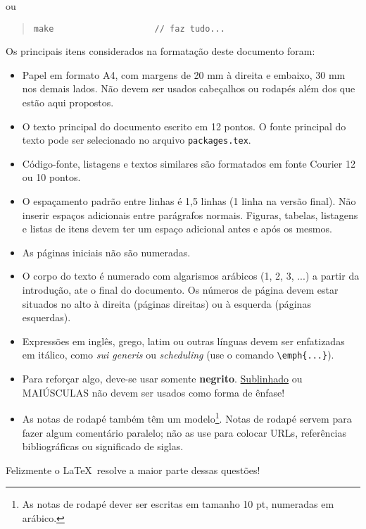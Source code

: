 ou

\begin{quote}
\begin{footnotesize}
\begin{verbatim}
make                    // faz tudo...
\end{verbatim}
\end{footnotesize}
\end{quote}

Os principais itens considerados na formatação deste documento foram:

\begin{itemize}

\item Papel em formato A4, com margens de 20 mm à direita e embaixo, 30 mm nos demais lados. Não devem ser usados cabeçalhos ou rodapés além dos que estão aqui propostos.

\item O texto principal do documento escrito em 12 pontos. O fonte principal do texto pode ser selecionado no arquivo \verb#packages.tex#.

\item Código-fonte, listagens e textos similares são formatados em fonte Courier 12 ou 10 pontos.

\item O espaçamento padrão entre linhas é 1,5 linhas (1 linha na versão final). Não inserir espaços adicionais entre parágrafos normais. Figuras, tabelas, listagens e listas de itens devem ter um espaço adicional antes e após os mesmos.

\item As páginas iniciais não são numeradas.

\item O corpo do texto é numerado com algarismos arábicos (1, 2, 3, ...) a partir da introdução, ate o final do documento. Os números de página devem estar situados no alto à direita (páginas direitas) ou à esquerda (páginas esquerdas).

\item Expressões em inglês, grego, latim ou outras línguas devem ser enfatizadas em itálico, como \emph{sui generis} ou \emph{scheduling} (use o comando \verb#\emph{...}#).

\item Para reforçar algo, deve-se usar somente \textbf{negrito}. \underline{Sublinhado} ou MAIÚSCULAS não devem ser usados como forma de ênfase!

\item As notas de rodapé também têm um modelo\footnote{As notas de rodapé dever ser escritas em tamanho 10 pt, numeradas em arábico.}. Notas de rodapé servem para fazer algum comentário paralelo; não as use para colocar URLs, referências bibliográficas ou significado de siglas.

\end{itemize}

Felizmente o \LaTeX\ resolve a maior parte dessas questões!

